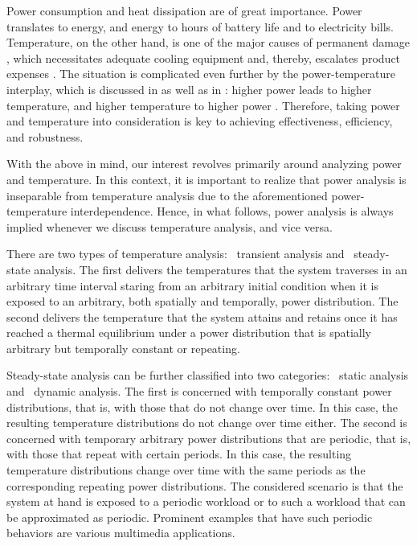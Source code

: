 Power consumption and heat dissipation are of great importance. Power translates
to energy, and energy to hours of battery life and to electricity bills.
Temperature, on the other hand, is one of the major causes of permanent damage
\cite{jedec2016}, which necessitates adequate cooling equipment and, thereby,
escalates product expenses \cite{chaudhry2015}. The situation is complicated
even further by the power-temperature interplay, which is discussed in
 as well as in : higher
power leads to higher temperature, and higher temperature to higher power
\cite{liu2007}. Therefore, taking power and temperature into consideration is
key to achieving effectiveness, efficiency, and robustness.

With the above in mind, our interest revolves primarily around analyzing power
and temperature. In this context, it is important to realize that power analysis
is inseparable from temperature analysis due to the aforementioned
power-temperature interdependence. Hence, in what follows, power analysis is
always implied whenever we discuss temperature analysis, and vice versa.

There are two types of temperature analysis: \one~transient analysis and
\two~steady-state analysis. The first delivers the temperatures that the system
traverses in an arbitrary time interval staring from an arbitrary initial
condition when it is exposed to an arbitrary, both spatially and temporally,
power distribution. The second delivers the temperature that the system attains
and retains once it has reached a thermal equilibrium under a power distribution
that is spatially arbitrary but temporally constant or repeating.

Steady-state analysis can be further classified into two categories: \one~static
analysis and \two~dynamic analysis. The first is concerned with temporally
constant power distributions, that is, with those that do not change over time.
In this case, the resulting temperature distributions do not change over time
either. The second is concerned with temporary arbitrary power distributions
that are periodic, that is, with those that repeat with certain periods. In this
case, the resulting temperature distributions change over time with the same
periods as the corresponding repeating power distributions. The considered
scenario is that the system at hand is exposed to a periodic workload or to such
a workload that can be approximated as periodic. Prominent examples that have
such periodic behaviors are various multimedia applications.

